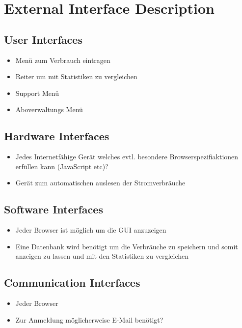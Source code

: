 \section{External Interface Description}
\subsection{User Interfaces}
\begin{itemize}
\item Menü zum Verbrauch eintragen
\item Reiter um mit Statistiken zu vergleichen
\item Support Menü
\item Aboverwaltungs Menü
\end{itemize}
\subsection{Hardware Interfaces}
\begin{itemize}
\item Jedes Internetfähige Gerät welches evtl. besondere Browserspezifiaktionen erfüllen kann (JavaScript etc)?
\item Gerät zum automatischen auslesen der Stromverbräuche
\end{itemize}
\subsection{Software Interfaces}
\begin{itemize}
\item Jeder Browser ist möglich um die GUI anzuzeigen
\item Eine Datenbank wird benötigt um die Verbräuche zu speichern und somit anzeigen zu lassen und mit den Statistiken zu vergleichen
\end{itemize}
\subsection{Communication Interfaces}
\begin{itemize}
\item Jeder Browser
\item Zur Anmeldung möglicherweise E-Mail benötigt?
\end{itemize}